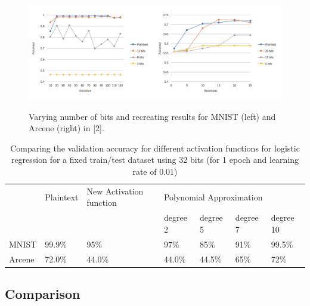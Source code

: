 \documentclass{article}
\begin{document}
\begin{figure}
\centering
  \includegraphics[scale=0.6]{mnistarcene.png}
  \label{fig:result4}
   \caption{Varying number of bits and recreating results for MNIST (left) and Arcene (right) in [2].}
\end{figure}

\begin{table}
\caption{Comparing the validation accuracy for different activation functions for logistic regression for a fixed train/test dataset using 32 bits (for 1 epoch and learning rate of 0.01)}
\centering
\label{my-label}
\begin{tabular}{@{}lllllll@{}}
\toprule
       & Plaintext & New Activation function & \multicolumn{4}{l}{Polynomial Approximation} \\
       &           &                         & degree 2  & degree 5  & degree 7 & degree 10 \\ \midrule
MNIST  & 99.9\%    & 95\%                    & 97\%      & 85\%      & 91\%     & 99.5\%    \\
Arcene & 72.0\%    &           44.0\%              &   44.0\%        &    44.5\%       &    65\%      &    72\%       \\ \bottomrule
\end{tabular}
\end{table}

\subsection{Comparison}
\end{document}
